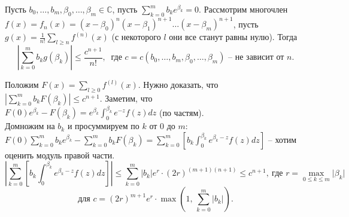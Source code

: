 \begin{lemma} \label{l14_lm7}
	Пусть $b_0,\dots,b_m,\beta_0,\dots,\beta_m \in \mathbb{C}$, пусть $\displaystyle \sum\limits_{k=0}^m b_ke^{\beta_k} = 0$. 
	Рассмотрим многочлен $f(x)=f_n(x) = (x-\beta_0)^n(x-\beta_1)^{n+1}\dots(x-\beta_m)^{n+1}$, пусть $\displaystyle g(x) = \frac{1}{n!}\sum\limits_{l \geq n} f^{(n)}(x)$ (с некоторого $l$ они все станут равны нулю). Тогда
	$$\left| \sum\limits_{k=0}^m b_kg(\beta_k) \right| \leq \frac{c^{n+1}}{n!}, \ \text{ где } c=c(b_0,\dots,b_m,\beta_0,\dots,\beta_m) \text{ -- не зависит от } n.$$
\end{lemma}
\begin{pf}
	Положим $\displaystyle F(x) = \sum\limits_{l \geq 0} f^{(l)}(x)$. Нужно доказать, что $\displaystyle \left| \sum\limits_{k=0}^m b_kF(\beta_k) \right| \leq c^{n+1}$. 
	Заметим, что $\displaystyle F(0)e^{\beta_k} - F(\beta_k) = e^{\beta_k} \int_0^{\beta_k}e^{-z}f(z)dz$ (по частям).\\
	Домножим на $b_k$ и просуммируем по $k$ от $0$ до $m$:\\
	$\displaystyle F(0)\sum_{k=0}^m b_ke^{\beta_k} - \sum\limits_{k=0}^m b_kF(\beta_k) = \sum\limits_{k=0}^m \left[ b_k\int_0^{\beta_k} e^{\beta_k-z}f(z)dz \right]$ -- хотим оценить модуль правой части.
	$$\left| \sum\limits_{k=0}^m \left[ b_k\int_0^{\beta_k} e^{\beta_k-z}f(z)dz \right] \right| \leq \sum\limits_{k=0}^m |b_k|e^r \cdot (2r)^{(m+1)(n+1)} \leq c^{n+1}, \ \text{где } r=\max\limits_{0\leq k \leq m} \lvert \beta_k \rvert$$
	$$\text{для } c=(2r)^{m+1}e^r\cdot\max\left( 1, \, \sum\limits_{k=0}^m \lvert b_k \rvert \right).$$
\end{pf}

